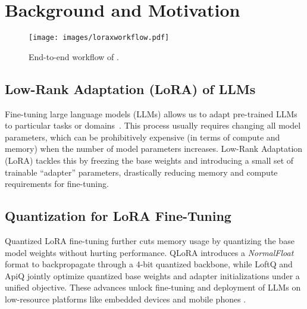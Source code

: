 \section{Background and Motivation}
\label{sec:background}

\begin{figure*}[ht]
\begin{center}
\centerline{\texttt{[image: images/loraxworkflow.pdf]}}
\vspace{-10pt}
\caption{End-to-end workflow of \FWName{}.}
\label{fig:e2eworkflow}
\end{center}
\vspace{-30pt}
\end{figure*}

\subsection{Low-Rank Adaptation (LoRA) of LLMs}

Fine-tuning large language models (LLMs) allows us to adapt pre-trained LLMs to particular tasks or domains~\cite{wei2021finetuned,wang2022super, ziegler2019fine}.
This process usually requires changing all model parameters, which can be prohibitively expensive (in terms of compute and memory) when the number of model parameters increases.
Low-Rank Adaptation (LoRA) \cite{hu2021lora} tackles this by freezing the base weights and introducing a small set of trainable ``adapter'' parameters, drastically reducing memory and compute requirements for fine-tuning.


\subsection{Quantization for LoRA Fine-Tuning}

Quantized LoRA fine-tuning further cuts memory usage by quantizing the base model weights without hurting performance. QLoRA \cite{dettmers2024qlora} introduces a \textit{NormalFloat} format to backpropagate through a 4-bit quantized backbone, while LoftQ \cite{li2023loftq} and ApiQ \cite{liao2024apiq} jointly optimize quantized base weights and adapter initializations under a unified objective. These advances unlock fine-tuning and deployment of LLMs on low-resource platforms like embedded devices \cite{shen2023agilequantactivationguidedquantizationfaster, chai2025flexquantelasticquantizationframework} and mobile phones \cite{wang2025bitstackanysizecompressionlarge, tan2024mobilequantmobilefriendlyquantizationondevice}.

